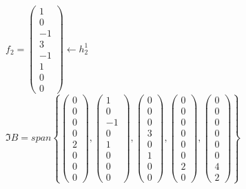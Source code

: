 \documentclass[a4paper, 10pt]{article}
\theoremstyle{theoremdd}
\theoremstyle{theoremdd}
\theoremstyle{theoremdd}
\theoremstyle{theoremdd}
\theoremstyle{theoremdd}
\theoremstyle{theoremdd}
\theoremstyle{theoremdd}
\theoremstyle{theoremdd}
\begin{document}
$f_2 = \begin{pmatrix}
1 \\ 0 \\ -1 \\ 3 \\ -1 \\ 1 \\ 0 \\ 0
\end{pmatrix} \longleftarrow h_2^1$
\bigskip \\
$\Im B = span \left\{ \begin{pmatrix} 0 \\ 0 \\ 0 \\ 0 \\ 2 \\ 0 \\ 0 \\ 0 \end{pmatrix}, \begin{pmatrix} 1 \\ 0 \\ -1 \\ 0 \\ 1 \\ 0 \\ 0 \\ 0 \end{pmatrix}, \begin{pmatrix} 0 \\ 0 \\ 0 \\ 3 \\ 0 \\ 1 \\ 0 \\ 0 \end{pmatrix}, \begin{pmatrix} 0 \\ 0 \\ 0 \\ 0 \\ 0 \\ 0 \\ 2 \\ 0 \end{pmatrix}, \begin{pmatrix} 0 \\ 0 \\ 0 \\ 0 \\ 0 \\ 0 \\ 4 \\ 2 \end{pmatrix} \right\}$\\
\end{document}

